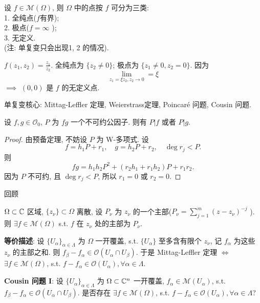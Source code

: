 设 $f \in \mathcal{M}(\Omega )$, 则 $\Omega $  中的点按 $f$  可分为三类:  \\
1. 全纯点($f$有界);\\
2. 极点($f=\infty $ );\\
3. 无定义.\\
(注: 单复变只会出现1, 2 的情况).

\begin{example}
  $f(z_1,z_2)=\frac{z_1}{z_2}$. 全纯点为 $\{z_2 \neq 0\}$; 极点为 $\{z_1 \neq 0,z_2=0\}$. 因为 
  $$ \lim_{z_1= \xi z_2 , z_2 \to 0}=\xi   $$
  $\implies $ $(0,0)$ 是 $f$ 的无定义点.      
\end{example}

\begin{remark}
  单复变核心: Mittag-Leffler 定理, Weierstrass定理, Poincar\'e 问题, Cousin 问题.
\end{remark}

\begin{theorem}
  设 $f,g \in \mathcal{O}_0$, $P$ 为 $fg$ 一个不可约公因子. 则有 $P|f$ 或者 $P|g$.     
\end{theorem}
\begin{proof}
  由预备定理, 不妨设 $P$ 为 W-多项式. 设
  $$ f=h_1 P+r_1, \quad g=h_2 P+r_2, \quad \deg r_j <P. $$ 
  则
  $$ fg=h_1h_2P^2+(r_2h_1+r_1h_2)P+r_1r_2.  $$
  因为 $P$ 不可约, 且 $\deg r_j <P$, 
  所以 $r_1=0$ 或 $r_2=0$.    
\end{proof}

回顾 
\begin{theorem}
  $\Omega \subset {\mathbb C}$ 区域, $\{z_{\nu }\} \subset \Omega $ 离散, 设 $P_{\nu }$ 为 $z_{\nu }$ 的一个主部($P_{\nu }=\sum_{j=1}^{m}(z-z_{\nu })^{-j}$ ). 
  则 $\exists f \in \mathcal{M}(\Omega )$ s.t. $f$ 在 $z_{\nu }$ 处的主部为 $P_{\nu }.$        
\end{theorem}
\textbf{等价描述}: 设 $\{U_{\alpha }\}_{\alpha \in \Lambda  } $ 为 $\Omega $ 一开覆盖, s.t.  $\{U_{\alpha }\}$ 至多含有限个 $z_{\nu }$, 记 $f_{\alpha }$ 为这些 $z_{\nu }$ 的主部之和. 则 
$f_{\beta }-f_{\alpha } \in \mathcal{O}(U_{\alpha } \cap U_{\beta })$.   
于是 Mittag-Leffler 定理 $\Leftrightarrow $ $\exists f \in \mathcal{M}(\Omega )$, s.t. $f-f_{\alpha } \in \mathcal{O}(U_{\alpha }), \forall \alpha \in \Lambda  $.      

\noindent\textbf{Cousin 问题 I}: 设 $\{U_{\alpha }\}_{\alpha \in \Lambda  } $ 为 $\Omega \subset {\mathbb C}^n $ 一开覆盖, $f_{\alpha } \in \mathcal{M}(U_{\alpha })$, s.t. 
$f_{\beta }-f_{\alpha } \in \mathcal{O}(U_{\alpha } \cap U_{\beta })$.  
是否存在 $\exists f \in \mathcal{M}(\Omega )$, s.t. $f-f_{\alpha } \in \mathcal{O}(U_{\alpha }), \forall \alpha \in \Lambda  $? 

